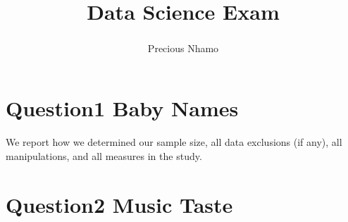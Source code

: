 \documentclass[
  man,floatsintext]{apa6}
\title{Data Science Exam}
\author{Precious Nhamo\textsuperscript{}}
\date{}
\affiliation{\phantom{0}}
\begin{document}
\maketitle

\section{Question1 Baby Names}\label{question1-baby-names}

We report how we determined our sample size, all data exclusions (if any), all manipulations, and all measures in the study.

\section{Question2 Music Taste}\label{question2-music-taste}
\end{document}
